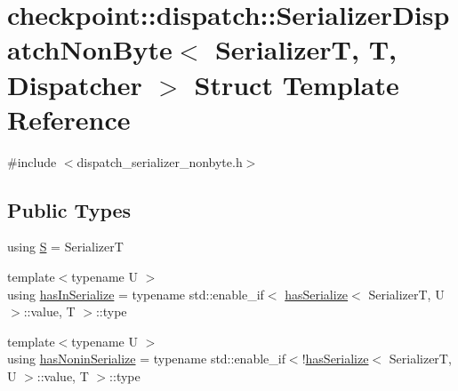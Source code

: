 \hypertarget{structcheckpoint_1_1dispatch_1_1_serializer_dispatch_non_byte}{}\section{checkpoint\+:\+:dispatch\+:\+:Serializer\+Dispatch\+Non\+Byte$<$ SerializerT, T, Dispatcher $>$ Struct Template Reference}
\label{structcheckpoint_1_1dispatch_1_1_serializer_dispatch_non_byte}


{\ttfamily \#include $<$dispatch\+\_\+serializer\+\_\+nonbyte.\+h$>$}

\subsection*{Public Types}
\begin{DoxyCompactItemize}
\item 
using \hyperlink{structcheckpoint_1_1dispatch_1_1_serializer_dispatch_non_byte_a456d0c02fc35667989d79ddbb0393776}{S} = SerializerT
\item 
{\footnotesize template$<$typename U $>$ }\\using \hyperlink{structcheckpoint_1_1dispatch_1_1_serializer_dispatch_non_byte_a7f2203710503e6ea7a5c4a565795a1d0}{has\+In\+Serialize} = typename std\+::enable\+\_\+if$<$ \hyperlink{structcheckpoint_1_1dispatch_1_1has_serialize}{has\+Serialize}$<$ SerializerT, U $>$\+::value, T $>$\+::type
\item 
{\footnotesize template$<$typename U $>$ }\\using \hyperlink{structcheckpoint_1_1dispatch_1_1_serializer_dispatch_non_byte_ad59e5c933a762ce90d1ab5f7ca04ca9f}{has\+Nonin\+Serialize} = typename std\+::enable\+\_\+if$<$!\hyperlink{structcheckpoint_1_1dispatch_1_1has_serialize}{has\+Serialize}$<$ SerializerT, U $>$\+::value, T $>$\+::type
\end{DoxyCompactItemize}
